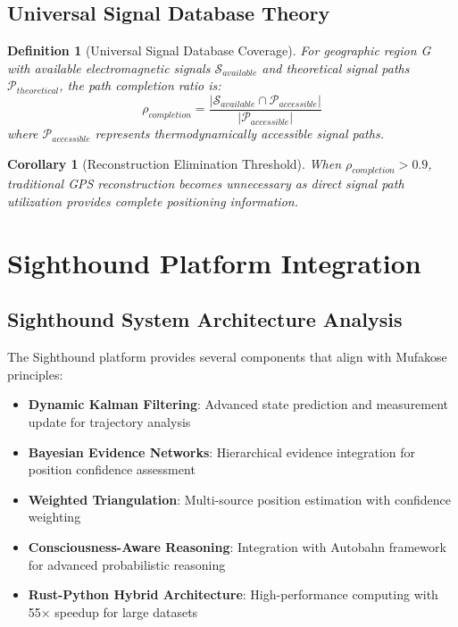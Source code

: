 \documentclass[12pt,a4paper]{article}
\newtheorem{definition}{Definition}
\newtheorem{corollary}{Corollary}
\begin{document}
\subsection{Universal Signal Database Theory}

\begin{definition}[Universal Signal Database Coverage]
For geographic region G with available electromagnetic signals $\mathcal{S}_{available}$ and theoretical signal paths $\mathcal{P}_{theoretical}$, the path completion ratio is:
\begin{equation}
\rho_{completion} = \frac{|\mathcal{S}_{available} \cap \mathcal{P}_{accessible}|}{|\mathcal{P}_{accessible}|}
\end{equation}
where $\mathcal{P}_{accessible}$ represents thermodynamically accessible signal paths.
\end{definition}

\begin{corollary}[Reconstruction Elimination Threshold]
When $\rho_{completion} > 0.9$, traditional GPS reconstruction becomes unnecessary as direct signal path utilization provides complete positioning information.
\end{corollary}

\section{Sighthound Platform Integration}

\subsection{Sighthound System Architecture Analysis}

The Sighthound platform provides several components that align with Mufakose principles:

\begin{itemize}
\item \textbf{Dynamic Kalman Filtering}: Advanced state prediction and measurement update for trajectory analysis
\item \textbf{Bayesian Evidence Networks}: Hierarchical evidence integration for position confidence assessment
\item \textbf{Weighted Triangulation}: Multi-source position estimation with confidence weighting
\item \textbf{Consciousness-Aware Reasoning}: Integration with Autobahn framework for advanced probabilistic reasoning
\item \textbf{Rust-Python Hybrid Architecture}: High-performance computing with 55× speedup for large datasets
\end{itemize}
\end{document}
